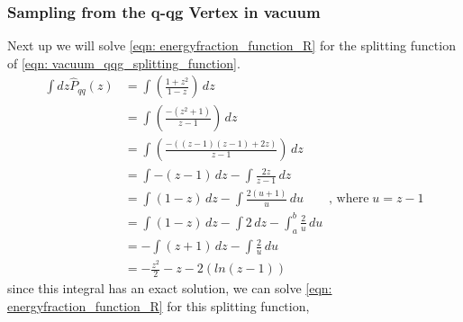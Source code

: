 \documentclass[main.tex]{subfiles}
\begin{document}
\subsubsection{Sampling from the q-qg Vertex in vacuum}
Next up we will solve \autoref{eqn: energyfraction_function_R} for the \qqg splitting function of \autoref{eqn: vacuum_qqg_splitting_function}.
\begin{align}
    \int dz\hat{P}_{qq}(z) &= \int \left(\frac{1+z^2}{1-z} \right)\, dz \nonumber \\
    &= \int \left(\frac{-(z^2+1)}{z-1} \right)\, dz \nonumber \\
    &= \int \left(\frac{-((z-1)(z-1)+2z)}{z-1} \right)\, dz \nonumber \\
    &= \int -(z-1)\, dz - \int \frac{2z}{z-1} \, dz \nonumber \\
    &= \int (1-z) \, dz - \int \frac{2(u+1)}{u} \, du \qquad \text{, where}\; u=z-1 \nonumber \\
    &= \int (1-z) \, dz - \int 2\, dz - \int_a^b \frac{2}{u} \, du \nonumber  \\
    &= -\int (z+1) \, dz - \int \frac{2}{u} \, du \nonumber  \\
    &= -\frac{z^2}{2} - z - 2\left( ln(z-1)\right) 
\end{align}
since this integral has an exact solution, we can solve \autoref{eqn: energyfraction_function_R} for this splitting function,
\end{document}
